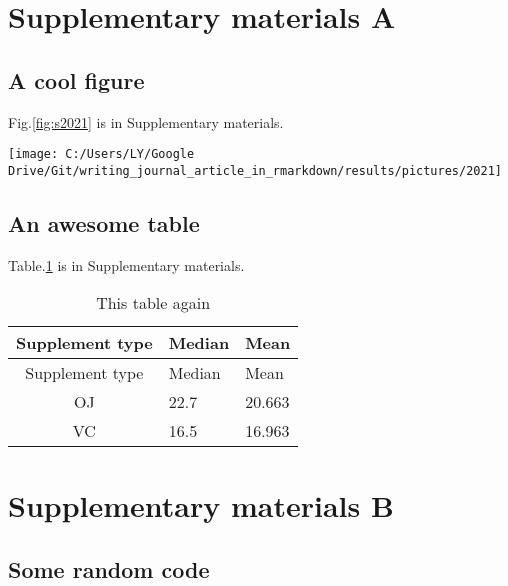 \documentclass[review]{elsarticle} %
\let\origfigure\figure
\let\endorigfigure\endfigure
\renewenvironment{figure}[1][2] {
    \expandafter\origfigure\expandafter[H]
} {
    \endorigfigure
}
\begin{document}
\section{Supplementary materials A}\label{appendixA}

\subsection{A cool figure}\label{a-cool-figure}

Fig.\ref{fig:s2021} is in Supplementary materials.

\begin{figure}

{\centering \texttt{[image: C:/Users/LY/Google Drive/Git/writing\_journal\_article\_in\_rmarkdown/results/pictures/2021]} 

}

\caption{A plot in Supplementary Materials}\label{fig:s2021}
\end{figure}

\subsection{An awesome table}\label{an-awesome-table}

Table.\ref{tab:stable} is in Supplementary materials.

\begin{longtable}[]{@{}cll@{}}
\caption{\label{tab:unnamed-chunk-12}\label{tab:stable}This table
again}\tabularnewline
\toprule
Supplement type & Median & Mean\tabularnewline
\midrule
\endfirsthead
\toprule
Supplement type & Median & Mean\tabularnewline
\midrule
\endhead
OJ & 22.7 & 20.663\tabularnewline
VC & 16.5 & 16.963\tabularnewline
\bottomrule
\end{longtable}

\newpage

\renewcommand{\thefigure}{B.\arabic{figure}}

\setcounter{figure}{0} \renewcommand{\thetable}{B.\arabic{table}}
\setcounter{table}{0} \renewcommand{\theequation}{B.\arabic{equation}}
\setcounter{equation}{0}

\section{Supplementary materials B}\label{appendixB}

\subsection{Some random code}\label{some-random-code}
\end{document}
